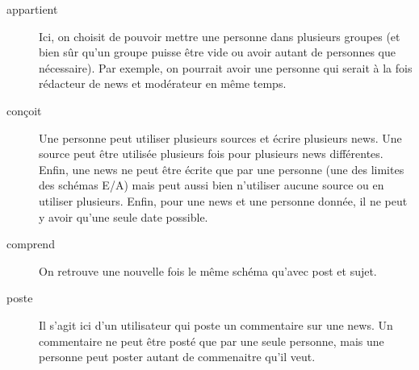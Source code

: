 \begin{description}
	\item[appartient] Ici, on choisit de pouvoir mettre une personne dans plusieurs groupes (et bien sûr qu'un groupe puisse être vide ou avoir autant de personnes que nécessaire). Par exemple, on pourrait avoir une personne qui serait à la fois rédacteur de news et modérateur en même temps. 
	\item[conçoit] Une personne peut utiliser plusieurs sources et écrire plusieurs news. Une source peut être utilisée plusieurs fois pour plusieurs news différentes. Enfin, une news ne peut être écrite que par une personne (une des limites des schémas E/A) mais peut aussi bien n'utiliser aucune source ou en utiliser plusieurs. Enfin, pour une news et une personne donnée, il ne peut y avoir qu'une seule date possible.
	\item[comprend] On retrouve une nouvelle fois le même schéma qu'avec post et sujet. 
	\item[poste] Il s'agit ici d'un utilisateur qui poste un commentaire sur une news. Un commentaire ne peut être posté que par une seule personne, mais une personne peut poster autant de commenaitre qu'il veut.
\end{description}

